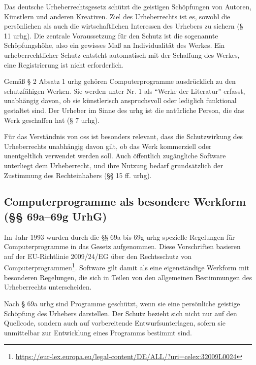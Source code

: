 Das deutsche Urheberrechtsgesetz schützt die geistigen Schöpfungen von Autoren, Künstlern und anderen Kreativen.
Ziel des Urheberrechts ist es, sowohl die persönlichen als auch die wirtschaftlichen Interessen des Urhebers zu sichern (§ 11 \gls{urhg}).
Die zentrale Voraussetzung für den Schutz ist die sogenannte Schöpfungshöhe, also ein gewisses Maß an Individualität des Werkes.
Ein urheberrechtlicher Schutz entsteht automatisch mit der Schaffung des Werkes, eine Registrierung ist nicht erforderlich.

Gemäß § 2 Absatz 1 \gls{urhg} gehören Computerprogramme ausdrücklich zu den schutzfähigen Werken.
Sie werden unter Nr. 1 als \enquote{Werke der Literatur} erfasst, unabhängig davon, ob sie künstlerisch anspruchsvoll oder lediglich funktional gestaltet sind.
Der Urheber im Sinne des \gls{urhg} ist die natürliche Person, die das Werk geschaffen hat (§ 7 \gls{urhg}).

Für das Verständnis von \gls{oss} ist besonders relevant, dass die Schutzwirkung des Urheberrechts unabhängig davon gilt, ob das Werk kommerziell oder unentgeltlich verwendet werden soll.
Auch öffentlich zugängliche Software unterliegt dem Urheberrecht, und ihre Nutzung bedarf grundsätzlich der Zustimmung des Rechteinhabers (§§ 15 ff. \gls{urhg}).


\subsection{Computerprogramme als besondere Werkform (§§ 69a–69g UrhG)}

Im Jahr 1993 wurden durch die §§ 69a bis 69g \gls{urhg} spezielle Regelungen für Computerprogramme in das Gesetz aufgenommen.
Diese Vorschriften basieren auf der EU-Richtlinie 2009/24/EG über den Rechtsschutz von Computerprogrammen\footnote{\url{https://eur-lex.europa.eu/legal-content/DE/ALL/?uri=celex:32009L0024}}.
Software gilt damit als eine eigenständige Werkform mit besonderen Regelungen, die sich in Teilen von den allgemeinen Bestimmungen des Urheberrechts unterscheiden.

Nach § 69a \gls{urhg} sind Programme geschützt, wenn sie eine persönliche geistige Schöpfung des Urhebers darstellen.
Der Schutz bezieht sich nicht nur auf den Quellcode, sondern auch auf vorbereitende Entwurfsunterlagen, sofern sie unmittelbar zur Entwicklung eines Programms bestimmt sind.

